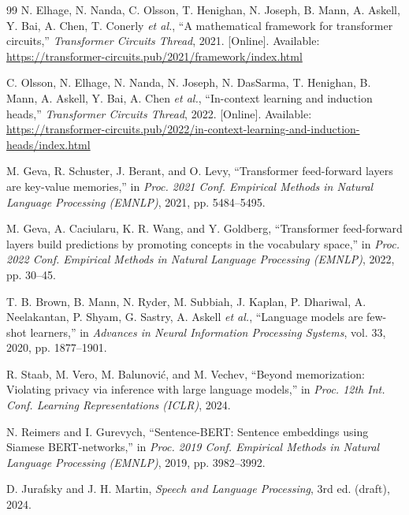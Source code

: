 \documentclass[conference]{IEEEtran}
\theoremstyle{definition}
\begin{document}
\begin{thebibliography}{99}
N. Elhage, N. Nanda, C. Olsson, T. Henighan, N. Joseph, B. Mann, A. Askell, Y. Bai, A. Chen, T. Conerly \emph{et al.}, ``A mathematical framework for transformer circuits,'' \emph{Transformer Circuits Thread}, 2021. [Online]. Available: \url{https://transformer-circuits.pub/2021/framework/index.html}

C. Olsson, N. Elhage, N. Nanda, N. Joseph, N. DasSarma, T. Henighan, B. Mann, A. Askell, Y. Bai, A. Chen \emph{et al.}, ``In-context learning and induction heads,'' \emph{Transformer Circuits Thread}, 2022. [Online]. Available: \url{https://transformer-circuits.pub/2022/in-context-learning-and-induction-heads/index.html}

M. Geva, R. Schuster, J. Berant, and O. Levy, ``Transformer feed-forward layers are key-value memories,'' in \emph{Proc. 2021 Conf. Empirical Methods in Natural Language Processing (EMNLP)}, 2021, pp. 5484--5495.

M. Geva, A. Caciularu, K. R. Wang, and Y. Goldberg, ``Transformer feed-forward layers build predictions by promoting concepts in the vocabulary space,'' in \emph{Proc. 2022 Conf. Empirical Methods in Natural Language Processing (EMNLP)}, 2022, pp. 30--45.

T. B. Brown, B. Mann, N. Ryder, M. Subbiah, J. Kaplan, P. Dhariwal, A. Neelakantan, P. Shyam, G. Sastry, A. Askell \emph{et al.}, ``Language models are few-shot learners,'' in \emph{Advances in Neural Information Processing Systems}, vol. 33, 2020, pp. 1877--1901.

R. Staab, M. Vero, M. Balunovi\'c, and M. Vechev, ``Beyond memorization: Violating privacy via inference with large language models,'' in \emph{Proc. 12th Int. Conf. Learning Representations (ICLR)}, 2024.

N. Reimers and I. Gurevych, ``Sentence-BERT: Sentence embeddings using Siamese BERT-networks,'' in \emph{Proc. 2019 Conf. Empirical Methods in Natural Language Processing (EMNLP)}, 2019, pp. 3982--3992.

D. Jurafsky and J. H. Martin, \emph{Speech and Language Processing}, 3rd ed. (draft), 2024.

\end{thebibliography}
\end{document}
